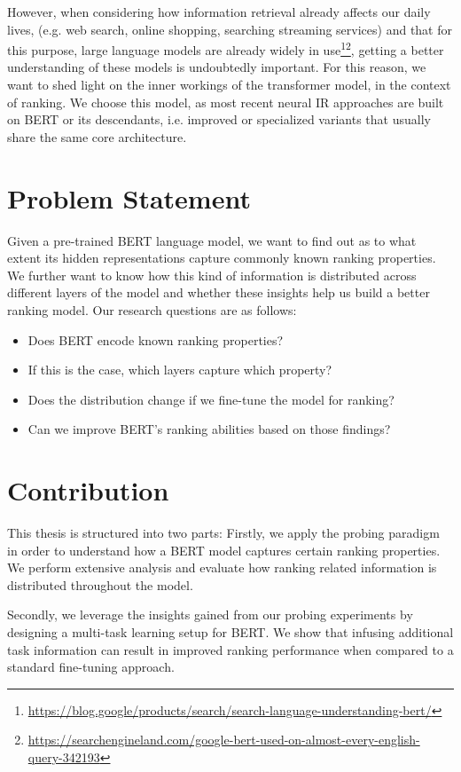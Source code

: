 However, when considering how information retrieval already affects our daily lives, (e.g. web search, online shopping, searching streaming services) and that for this purpose, large language models are already widely in use\footnote{\url{https://blog.google/products/search/search-language-understanding-bert/}}\footnote{\url{https://searchengineland.com/google-bert-used-on-almost-every-english-query-342193}}, getting a better understanding of these models is undoubtedly important. For this reason, we want to shed light on the inner workings of the  \cite{devlin-etal-2019-bert} transformer model, in the context of ranking. We choose this model, as most recent neural IR approaches are built on BERT or its descendants, i.e. improved or specialized variants that usually share the same core architecture.

\section{Problem Statement}
Given a pre-trained BERT language model, we want to find out as to what extent its hidden representations capture commonly known ranking properties. We further want to know how this kind of information is distributed across different layers of the model and whether these insights help us build a better ranking model. Our research questions are as follows:
\begin{itemize}
    \item Does BERT encode known ranking properties?
    \item If this is the case, which layers capture which property?
    \item Does the distribution change if we fine-tune the model for ranking?
    \item Can we improve BERT's ranking abilities based on those findings?
\end{itemize}

\section{Contribution}
This thesis is structured into two parts: Firstly, we apply the probing paradigm in order to understand how a BERT model captures certain ranking properties. We perform extensive analysis and evaluate how ranking related information is distributed throughout the model.

Secondly, we leverage the insights gained from our probing experiments by designing a multi-task learning setup for BERT. We show that infusing additional task information can result in improved ranking performance when compared to a standard fine-tuning approach.

